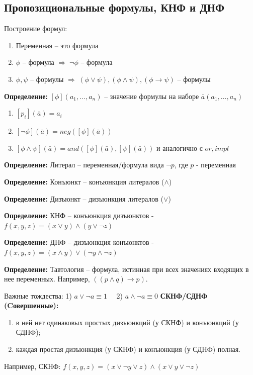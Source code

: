 \subsection{Пропозициональные формулы, КНФ и ДНФ}
Построение формул:
\begin{enumerate}
    \item Переменная -- это формула
    \item $\phi$ -- формула $\Rightarrow \; \neg \phi$ -- формула
    \item $\phi,\psi$ -- формулы $\Rightarrow \; (\phi\lor\psi), (\phi\land\psi), (\phi\to\psi)$ -- формулы
\end{enumerate}
\textbf{Определение:} $[\phi](a_1,\dots,a_n)$ -- значение формулы на наборе $\bar a(a_1,\dots,a_n)$
\begin{enumerate}
    \item $[p_i](\bar a)=a_i$
    \item $[\neg \phi](\bar a)=neg([\phi](\bar a))$
    \item $[\phi \land \psi](\bar a)=and([\phi](\bar a), [\psi](\bar a))$ и аналогично с $or, impl$
\end{enumerate}

\textbf{Определение:} Литерал -- переменная/формула вида $\neg p$, где $p$ - переменная

\textbf{Определение:} Конъюнкт -- конъюнкция литералов ($\land$)

\textbf{Определение:} Дизъюнкт -- дизъюнкция литералов ($\lor$)

\textbf{Определение:} КНФ -- конъюнкция дизъюнктов - $f(x,y,z)=(x\lor y)\land(y \lor \neg z)$

\textbf{Определение:} ДНФ -- дизъюнкция конъюнктов - $f(x,y,z)=(x\land y)\lor(\neg y \land \neg z)$

\textbf{Определение:} Тавтология -- формула, истинная при всех значениях входящих в нее переменных. Например, $((p \land q) \to p)$. 

Важные тождества: 1) $a\lor\neg a \equiv 1 \quad$ 2) $a\land \neg a \equiv 0$
\hfill \break
\newline \noindent \textbf{СКНФ/СДНФ (Cовершенные):}
\begin{enumerate}
    \item в ней нет одинаковых простых дизъюнкций (у СКНФ) и конъюнкций (у СДНФ);
    \item каждая простая дизъюнкция (у СКНФ) и конъюнкция (у СДНФ) полная.
\end{enumerate}
Например, СКНФ: $f(x,y,z)=(x\lor\neg y\lor z)\land(x\lor y\lor\neg z)$

